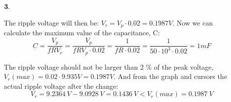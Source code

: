 \documentclass[11pt,a4paper]{article}
\begin{document}
\begin{enumerate}
  \item[$\bold{3.}$]
  
  	The ripple voltage will then be: $V_r = V_p \cdot 0.02 = 0.1987 V$. Now we can calculate the maximum value of the capacitance, C: $$ C = \dfrac{V_p}{f R V_r} = \dfrac{V_p}{f R V_p \cdot 0.02} = \dfrac{1}{f R \cdot 0.02} = \dfrac{1}{50 \cdot 10^3 \cdot 0.02} = 1mF $$
  
  \begin{minipage}{\linewidth}
    	\centering
  \end{minipage}
    
   The ripple voltage should not be larger than 2 $\%$ of the peak voltage, $V_r(max) = 0.02 \cdot 9.935 V = 0.1987 V$. And from the graph and cursors the actual ripple voltage after the change: $$ V_r = 9.2364 \: V - 9.0928 \: V = 0.1436 \: V < V_r(max) = 0.1987 \: V$$
   

\end{enumerate}
\end{document}
